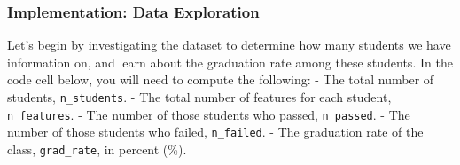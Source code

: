 \documentclass[11pt]{article}
\begin{document}
    \subsubsection{Implementation: Data
Exploration}\label{implementation-data-exploration}

Let's begin by investigating the dataset to determine how many students
we have information on, and learn about the graduation rate among these
students. In the code cell below, you will need to compute the
following: - The total number of students, \texttt{n\_students}. - The
total number of features for each student, \texttt{n\_features}. - The
number of those students who passed, \texttt{n\_passed}. - The number of
those students who failed, \texttt{n\_failed}. - The graduation rate of
the class, \texttt{grad\_rate}, in percent (\%).
\end{document}
